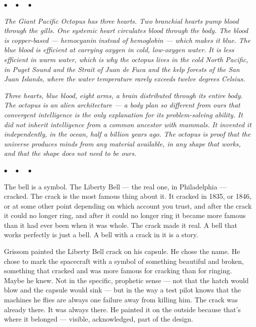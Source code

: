 \documentclass[12pt, letterpaper]{article}
\begin{document}
\begin{center}
$\bullet\quad\bullet\quad\bullet$
\end{center}

\emph{The Giant Pacific Octopus has three hearts. Two branchial hearts pump blood through the gills. One systemic heart circulates blood through the body. The blood is copper-based --- hemocyanin instead of hemoglobin --- which makes it blue. The blue blood is efficient at carrying oxygen in cold, low-oxygen water. It is less efficient in warm water, which is why the octopus lives in the cold North Pacific, in Puget Sound and the Strait of Juan de Fuca and the kelp forests of the San Juan Islands, where the water temperature rarely exceeds twelve degrees Celsius.}

\emph{Three hearts, blue blood, eight arms, a brain distributed through its entire body. The octopus is an alien architecture --- a body plan so different from ours that convergent intelligence is the only explanation for its problem-solving ability. It did not inherit intelligence from a common ancestor with mammals. It invented it independently, in the ocean, half a billion years ago. The octopus is proof that the universe produces minds from any material available, in any shape that works, and that the shape does not need to be ours.}

\begin{center}
$\bullet\quad\bullet\quad\bullet$
\end{center}

The bell is a symbol. The Liberty Bell --- the real one, in Philadelphia --- cracked. The crack is the most famous thing about it. It cracked in 1835, or 1846, or at some other point depending on which account you trust, and after the crack it could no longer ring, and after it could no longer ring it became more famous than it had ever been when it was whole. The crack made it real. A bell that works perfectly is just a bell. A bell with a crack in it is a story.

Grissom painted the Liberty Bell crack on his capsule. He chose the name. He chose to mark the spacecraft with a symbol of something beautiful and broken, something that cracked and was more famous for cracking than for ringing. Maybe he knew. Not in the specific, prophetic sense --- not that the hatch would blow and the capsule would sink --- but in the way a test pilot knows that the machines he flies are always one failure away from killing him. The crack was already there. It was always there. He painted it on the outside because that's where it belonged --- visible, acknowledged, part of the design.
\end{document}
